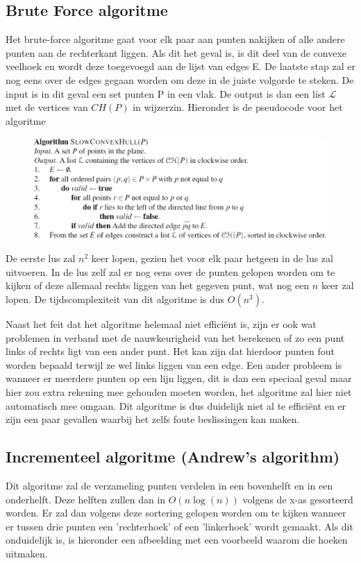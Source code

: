 \documentclass[12pt,a4paper]{article}
\begin{document}
	\subsection{Brute Force algoritme}
	Het brute-force algoritme gaat voor elk paar aan punten nakijken of alle andere punten aan de rechterkant liggen. Als dit het geval is, is dit deel van de convexe veelhoek en wordt deze toegevoegd aan de lijst van edges E. De laatste stap zal er nog eens over de edges gegaan worden om deze in de juiste volgorde te steken. 
	De input is in dit geval een set punten P in een vlak. De output is dan een list $\mathcal{L}$ met de vertices van $CH(P)$ in wijzerzin. Hieronder is de pseudocode voor het algoritme
	\begin{figure}[h]
		\centering
		\includegraphics[width=0.9\linewidth]{afbeeldingen/slowconvexhull}
		\label{fig:slowconvexhull}
	\end{figure}
	
	De eerste lus zal $n^2$ keer lopen, gezien het voor elk paar hetgeen in de lus zal uitvoeren. In de lus zelf zal er nog eens over de punten gelopen worden om te kijken of deze allemaal rechts liggen van het gegeven punt, wat nog een $n$ keer zal lopen. De tijdscomplexiteit van dit algoritme is dus $O(n^3)$. 
	
	Naast het feit dat het algoritme helemaal niet efficiënt is, zijn er ook wat problemen in verband met de nauwkeurigheid van het berekenen of zo een punt links of rechts ligt van een ander punt. Het kan zijn dat hierdoor punten fout worden bepaald terwijl ze wel links liggen van een edge. Een ander probleem is wanneer er meerdere punten op een lijn liggen, dit is dan een speciaal geval maar hier zou extra rekening mee gehouden moeten worden, het algoritme zal hier niet automatisch mee omgaan. Dit algoritme is dus duidelijk niet al te efficiënt en er zijn een paar gevallen waarbij het zelfs foute beslissingen kan maken. 
	
	
	\subsection{Incrementeel algoritme 	(Andrew's algorithm)}
	Dit algoritme zal de verzameling punten verdelen in een bovenhelft en in een onderhelft. Deze helften zullen dan in $O(n\log(n))$ volgens de x-as gesorteerd worden. Er zal dan volgens deze sortering gelopen worden om te kijken wanneer er tussen drie punten een 'rechterhoek' of een 'linkerhoek' wordt gemaakt. Als dit onduidelijk is, is hieronder een afbeelding met een voorbeeld waarom die hoeken uitmaken. 
	
\end{document}
